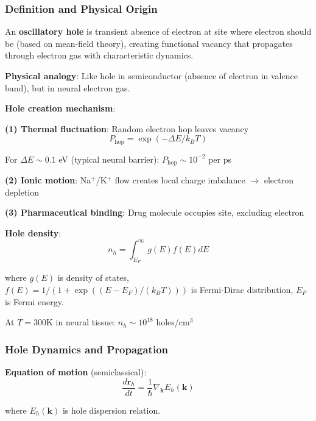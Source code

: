 \documentclass[11pt,onecolumn]{article}
\begin{document}
\subsubsection{Definition and Physical Origin}

\begin{definition}
An \textbf{oscillatory hole} is transient absence of electron at site where electron should be (based on mean-field theory), creating functional vacancy that propagates through electron gas with characteristic dynamics.
\end{definition}

\textbf{Physical analogy}: Like hole in semiconductor (absence of electron in valence band), but in neural electron gas.

\textbf{Hole creation mechanism}:

\textbf{(1) Thermal fluctuation}: Random electron hop leaves vacancy
\begin{equation}
P_{\text{hop}} = \exp(-\Delta E / k_B T)
\end{equation}

For $\Delta E \sim 0.1$ eV (typical neural barrier): $P_{\text{hop}} \sim 10^{-2}$ per ps

\textbf{(2) Ionic motion}: Na$^+$/K$^+$ flow creates local charge imbalance $\to$ electron depletion

\textbf{(3) Pharmaceutical binding}: Drug molecule occupies site, excluding electron

\textbf{Hole density}:
\begin{equation}
n_h = \int_{E_F}^{\infty} g(E) f(E) dE
\end{equation}

where $g(E)$ is density of states, $f(E) = 1/(1 + \exp((E-E_F)/(k_B T)))$ is Fermi-Dirac distribution, $E_F$ is Fermi energy.

At $T = 300$K in neural tissue: $n_h \sim 10^{18}$ holes/cm$^3$

\subsubsection{Hole Dynamics and Propagation}

\textbf{Equation of motion} (semiclassical):
\begin{equation}
\frac{d\mathbf{r}_h}{dt} = \frac{1}{\hbar}\nabla_{\mathbf{k}} E_h(\mathbf{k})
\end{equation}

where $E_h(\mathbf{k})$ is hole dispersion relation.
\end{document}
